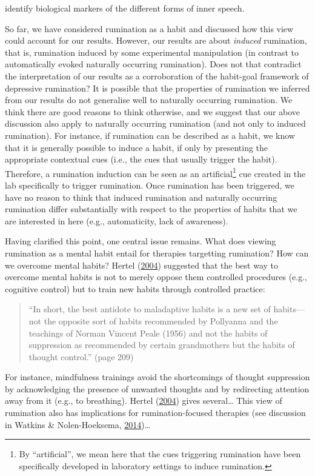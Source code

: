 \documentclass[a4paper,12pt,twoside,openright,oldfontcommands,final]{memoir}
\let\rmarkdownfootnote\footnote%
\def\footnote{\protect\rmarkdownfootnote}
\begin{document}
identify biological markers of the different forms of inner speech.

So far, we have considered rumination as a habit and discussed how this view could account for our results. However, our results are about \emph{induced} rumination, that is, rumination induced by some experimental manipulation (in contrast to automatically evoked naturally occurring rumination). Does not that contradict the interpretation of our results as a corroboration of the habit-goal framework of depressive rumination? It is possible that the properties of rumination we inferred from our results do not generalise well to naturally occurring rumination. We think there are good reasons to think otherwise, and we suggest that our above discussion also apply to naturally occurring rumination (and not only to induced rumination). For instance, if rumination can be described as a habit, we know that it is generally possible to induce a habit, if only by presenting the appropriate contextual cues (i.e., the cues that usually trigger the habit). Therefore, a rumination induction can be seen as an artificial\footnote{By \enquote{artificial}, we mean here that the cues triggering rumination have been specifically developed in laboratory settings to induce rumination.} cue created in the lab specifically to trigger rumination. Once rumination has been triggered, we have no reason to think that induced rumination and naturally occurring rumination differ substantially with respect to the properties of habits that we are interested in here (e.g., automaticity, lack of awareness).

Having clarified this point, one central issue remains. What does viewing rumination as a mental habit entail for therapies targetting rumination? How can we overcome mental habits? Hertel (\protect\hyperlink{ref-hertel_memory_2004}{2004}) suggested that the best way to overcome mental habits is not to merely oppose them controlled procedures (e.g., cognitive control) but to train new habits through controlled practice:

\begin{quote}
\enquote{In short, the best antidote to maladaptive habits is a new set of habits---not the opposite sort of habits recommended by Pollyanna and the teachings of Norman Vincent Peale (1956) and not the habits of suppression as recommended by certain grandmothers but the habits of thought control.} (page 209)
\end{quote}

For instance, mindfulness trainings avoid the shortcomings of thought suppression by acknowledging the presence of unwanted thoughts and by redirecting attention away from it (e.g., to breathing). Hertel (\protect\hyperlink{ref-hertel_memory_2004}{2004}) gives several\ldots{} This view of rumination also has implications for rumination-focused therapies (see discussion in Watkins \& Nolen-Hoeksema, \protect\hyperlink{ref-watkins_habit-goal_2014}{2014})\ldots{}
\end{document}
